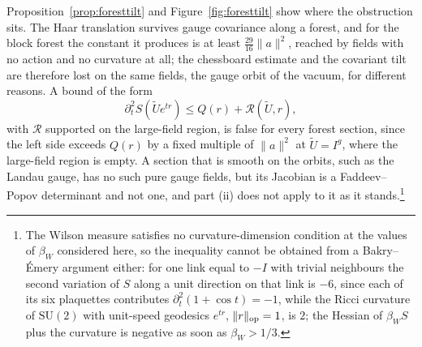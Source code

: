 \documentclass[11pt]{amsart}
\theoremstyle{definition}
\theoremstyle{remark}
\numberwithin{equation}{section}
\newcommand{\SU}{\mathrm{SU}}
\begin{document}
Proposition~\ref{prop:foresttilt} and Figure~\ref{fig:foresttilt} show where the obstruction sits. The
Haar translation survives gauge covariance along a forest, and for the
block forest the constant it produces is at least $\frac{29}{16}\|a\|^2$,
reached by fields with no action and no curvature at all; the chessboard
estimate and the covariant tilt are therefore lost on the same fields, the
gauge orbit of the vacuum, for different reasons. A bound of the form
\[
\partial_t^2S(\tilde Ue^{tr})\le Q(r)+\mathcal R(\tilde U,r),
\]
with $\mathcal R$ supported on the large-field region, is false for every
forest section, since the left side exceeds $Q(r)$ by a fixed multiple of
$\|a\|^2$ at $\tilde U=I^g$, where the large-field region is empty. A
section that is smooth on the orbits, such as the Landau gauge, has no
such pure gauge fields, but its Jacobian is a Faddeev--Popov determinant
and not one, and part (ii) does not apply to it as it stands.\footnote{The
Wilson measure satisfies no curvature-dimension condition at the values
of $\beta_W$ considered here, so the inequality cannot be obtained from a
Bakry--\'Emery argument either: for one link equal to $-I$ with trivial
neighbours the second variation of $S$ along a unit direction on that link
is $-6$, since each of its six plaquettes contributes $\partial_t^2(1+\cos
t)=-1$, while the Ricci curvature of $\SU(2)$ with unit-speed geodesics
$e^{tr}$, $\|r\|_{\rm op}=1$, is $2$; the Hessian of $\beta_WS$ plus the
curvature is negative as soon as $\beta_W>1/3$.}
\end{document}
